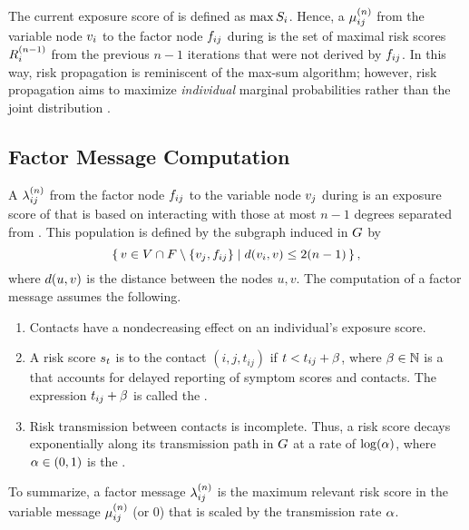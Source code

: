 The current exposure score of  is defined as $\max S_i$. Hence, a  $\mu_{ij}^{(n)}$ from the variable node $\vVariable[i]$ to the factor node $\vFactor[ij]$ during  is the set of maximal risk scores $\vIndexedExpScores{i}{n - 1}$ from the previous $n - 1$ iterations that were not derived by $\vFactor[ij]$. In this way, risk propagation is reminiscent of the max-sum algorithm; however, risk propagation aims to maximize \emph{individual} marginal probabilities rather than the joint distribution \cite[pp. 411--415]{Bishop2006}.

\subsection{Factor Message Computation}

\newcommand{\vMessageSet}{\vSet{M}}

A  $\lambda_{ij}^{(n)}$ from the factor node $\vFactor[ij]$ to the variable node $\vVariable[j]$ during  is an exposure score of  that is based on interacting with those at most $n - 1$ degrees separated from . This population is defined by the subgraph induced in $G$ by
%
\begin{equation*}
  \setBuilder{\vVariable \in \vVariables \cap \vFactors \setminus \{\vVariable[j], \vFactor[ij]\}}{\dist(\vVariable[i], \vVariable) \leq 2(n - 1)},
\end{equation*}
%
where $d(u, v)$ is the distance between the nodes $u, v$. The computation of a factor message assumes the following.
%
\begin{enumerate}
  \item Contacts have a nondecreasing effect on an individual's exposure score.
  \item A risk score $s_t$ is  to the contact $(i, j, t_{ij})$ if $t < t_{ij} +\beta$, where $\beta \in \mathbb{N}$ is a  that accounts for delayed reporting of symptom scores and contacts. The expression $t_{ij} +\beta$ is called the .
  \item Risk transmission between contacts is incomplete. Thus, a risk score decays exponentially along its transmission path in $G$ at a rate of $\log(\alpha)$, where $\alpha \in (0, 1)$ is the .
\end{enumerate}
%
To summarize, a factor message $\lambda_{ij}^{(n)}$ is the maximum relevant risk score in the variable message $\mu_{ij}^{(n)}$ (or 0) that is scaled by the transmission rate $\alpha$.

